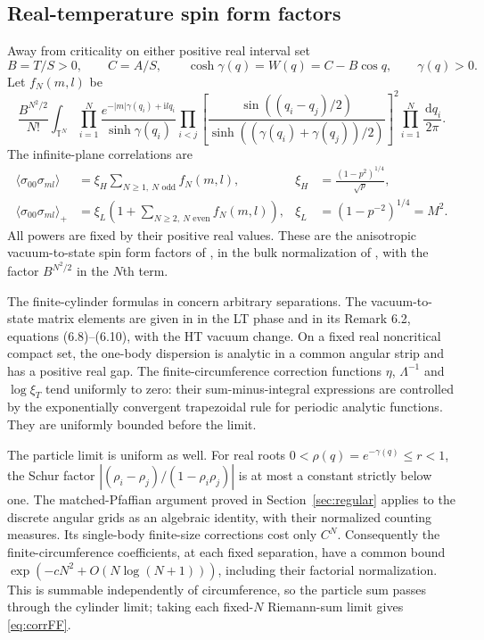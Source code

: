 \documentclass[11pt]{article}
\numberwithin{equation}{section}
\theoremstyle{definition}
\newcommand{\T}{\mathbb T}
\newcommand{\dd}{\,\mathrm d}
\newcommand{\ii}{\mathrm i}
\begin{document}
\subsection{Real-temperature spin form factors}
Away from criticality on either positive real interval set
\[
 B=T/S>0,\qquad C=A/S,\qquad
 \cosh\gamma(q)=W(q)=C-B\cos q,\qquad \gamma(q)>0.
\]
Let $f_N(m,l)$ be
\begin{equation}\label{eq:corrFF}
 \frac{B^{N^2/2}}{N!}\int_{\T^N}
 \prod_{i=1}^N\frac{e^{-|m|\gamma(q_i)+\ii lq_i}}{\sinh\gamma(q_i)}
 \prod_{i<j}\left[
 \frac{\sin((q_i-q_j)/2)}{\sinh((\gamma(q_i)+\gamma(q_j))/2)}
 \right]^2\prod_{i=1}^N\frac{\dd q_i}{2\pi}.
\end{equation}
The infinite-plane correlations are
\begin{align}
 \langle\sigma_{00}\sigma_{ml}\rangle
   &=\xi_H\sum_{N\ge1,\ N\text{ odd}}f_N(m,l),
   &\xi_H&=\frac{(1-p^2)^{1/4}}{\sqrt p},\label{eq:HTcorr}\\
 \langle\sigma_{00}\sigma_{ml}\rangle_+
   &=\xi_L\left(1+\sum_{N\ge2,\ N\text{ even}}f_N(m,l)\right),
   &\xi_L&=(1-p^{-2})^{1/4}=M^2.\label{eq:LTcorr}
\end{align}
All powers are fixed by their positive real values. These are the
anisotropic vacuum-to-state spin form factors of
\cite{BL,IL}, in the bulk normalization of \cite{ONGP}, with the factor
$B^{N^2/2}$ in the $N$th term.

The finite-cylinder formulas in \cite[(35)--(39)]{BL} concern arbitrary
separations. The vacuum-to-state matrix elements are given in
\cite[Theorem 6.1]{IL} in the LT phase and in its Remark 6.2,
equations (6.8)--(6.10), with the HT vacuum change.
On a fixed real noncritical compact set, the one-body dispersion is
analytic in a common angular strip and has a positive real gap. The
finite-circumference correction functions $\eta$, $\Lambda^{-1}$ and
$\log\xi_T$ tend uniformly to zero: their sum-minus-integral expressions
are controlled by the exponentially convergent trapezoidal rule for
periodic analytic functions. They are uniformly bounded before the limit.

The particle limit is uniform as well. For real roots
$0<\rho(q)=e^{-\gamma(q)}\le r<1$, the Schur factor
$|(\rho_i-\rho_j)/(1-\rho_i\rho_j)|$ is at most a constant strictly below
one. The matched-Pfaffian argument proved in
Section~\ref{sec:regular} applies to the discrete angular grids as an
algebraic identity, with their normalized counting measures. Its
single-body finite-size corrections cost only $C^N$. Consequently the
finite-circumference coefficients, at each fixed separation, have a
common bound $\exp(-cN^2+O(N\log(N+1)))$, including their factorial
normalization. This is summable independently of circumference, so the
particle sum passes through the cylinder limit; taking each fixed-$N$
Riemann-sum limit gives \eqref{eq:corrFF}.
\end{document}
